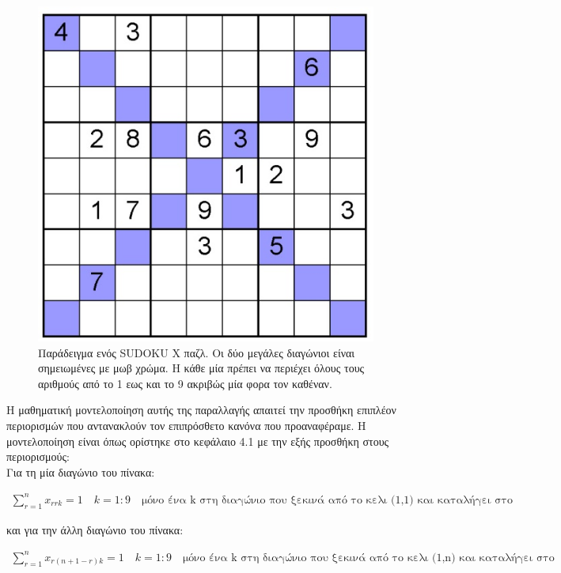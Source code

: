 \documentclass[12pt]{book}
\theoremstyle{definition}
\begin{document}
\begin{figure}[h]
	\centering	
	\includegraphics[scale=1.5]{Figures/sudokuX.jpg}
	\caption{Παράδειγμα ενός SUDOKU X παζλ. Οι δύο μεγάλες διαγώνιοι είναι σημειωμένες με μωβ χρώμα. Η κάθε μία πρέπει να περιέχει όλους τους αριθμούς από το 1 εως και το 9 ακριβώς μία φορα τον καθέναν.}
\end{figure}

Η μαθηματική μοντελοποίηση αυτής της παραλλαγής απαιτεί την προσθήκη επιπλέον περιορισμών που αντανακλούν τον επιπρόσθετο κανόνα που προαναφέραμε. Η μοντελοποίηση είναι όπως ορίστηκε στο κεφάλαιο 4.1 με την εξής προσθήκη στους περιορισμούς: \\

Για τη μία διαγώνιο του πίνακα:

\begin{align*}
	\sum_{r=1}^{n} x_{rrk} = 1 \quad k=1:9 \quad \text{μόνο ένα k στη διαγώνιο που ξεκινά από το κελι (1,1) και καταλήγει στο κελι (n,n)}
\end{align*}

και για την άλλη διαγώνιο του πίνακα:

\begin{align*}
\sum_{r=1}^{n} x_{r(n+1-r)k} = 1 \quad k=1:9 \quad \text{μόνο ένα k στη διαγώνιο που ξεκινά από το κελι (1,n) και καταλήγει στο κελι (n,1)}
\end{align*}
\end{document}
